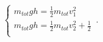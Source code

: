 \begin{equation}
    \begin{cases}
      m_{tot} g h = \frac{1}{2} m_{tot} v_1^2\\
      m_{tot} g h = \frac{1}{2} m_{tot} v_2^2 + \frac{1}{2}\\
    \end{cases}\,.
\end{equation}